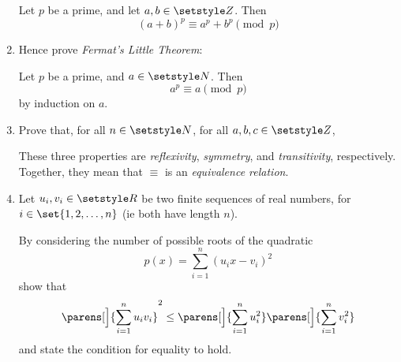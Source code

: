 \begin{enumerate}
  Let \(p\) be a prime, and let \(a, b \in \Integers\). Then
  \begin{equation*}
   (a + b)^p \equiv a^p + b^p \pmod p
  \end{equation*}
 \item
  Hence prove \emph{Fermat's Little Theorem}:

  Let \(p\) be a prime, and \(a \in \Naturals\). Then
  \begin{equation*}
   a^p \equiv a \pmod p
  \end{equation*}
  by induction on \(a\).
 \item
  Prove that, for all \(n \in \Naturals\), for all \(a, b, c \in \Integers\),
  These three properties are \emph{reflexivity}, \emph{symmetry}, and
  \emph{transitivity}, respectively. Together, they mean that \(\equiv\) is an
  \emph{equivalence relation}.
 \item
  Let \(u_i, v_i \in \Reals\) be two finite sequences of real numbers, for
  \(i \in \set{1, 2, \dotsc, n}\) (ie both have length \(n\)).

  By considering the number of possible roots of the quadratic
  \begin{equation*}
   p(x) = \sum_{i = 1}^n (u_i x - v_i)^2
  \end{equation*}
  show that
  \begin{equation*}
   \parens[\Big]{\sum_{i = 1}^n u_i v_i}^2
   \le \parens[\Big]{\sum_{i = 1}^n u_i^2}
       \parens[\Big]{\sum_{i = 1}^n v_i^2}
  \end{equation*}
  and state the condition for equality to hold.


\end{enumerate}
